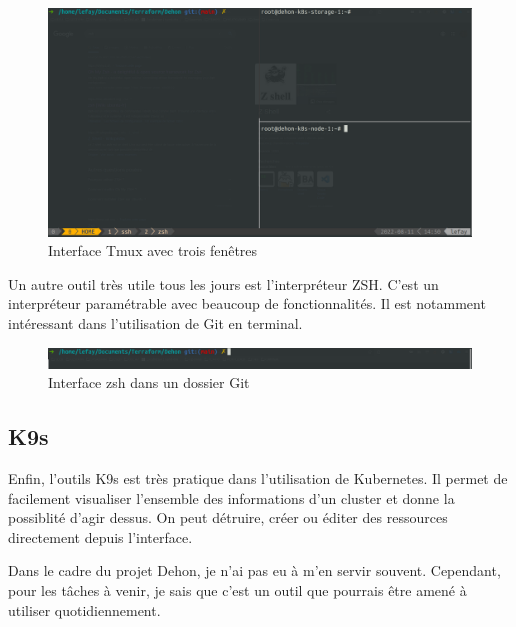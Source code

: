 \documentclass[12pt, a4paper, twoside]{article}
\begin{document}
\begin{figure}[!ht]
    \centering
        \includegraphics[width=\textwidth]{src/interface_tmux.png}
    \caption{Interface Tmux avec trois fenêtres}
    \label{fig:tmux}
\end{figure}

Un autre outil très utile tous les jours est l'interpréteur ZSH.
C'est un interpréteur paramétrable avec beaucoup de fonctionnalités.
Il est notamment intéressant dans l'utilisation de Git en terminal.

\begin{figure}[!ht]
    \centering
        \includegraphics[width=\textwidth]{src/interface_shell.png}
    \caption{Interface zsh dans un dossier Git}
    \label{fig:zsh}
\end{figure}

\newpage
\subsection{K9s}
Enfin, l'outils K9s est très pratique dans l'utilisation de \gls{Kubernetes}.
Il permet de facilement visualiser l'ensemble des informations d'un \gls{cluster} et donne la possiblité d'agir dessus.
On peut détruire, créer ou éditer des ressources directement depuis l'interface.

Dans le cadre du projet Dehon, je n'ai pas eu à m'en servir souvent.
Cependant, pour les tâches à venir, je sais que c'est un outil que pourrais être amené à utiliser quotidiennement.
\end{document}
